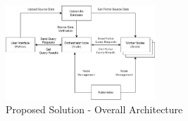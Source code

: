 \begin{figure}[h]
	\centering
	\includegraphics[width=0.5\textwidth]{chapters/diagrams/design/architecture-overall}
	\caption{Proposed Solution - Overall Architecture}
	\label{fig:overall-architecture}
\end{figure}


